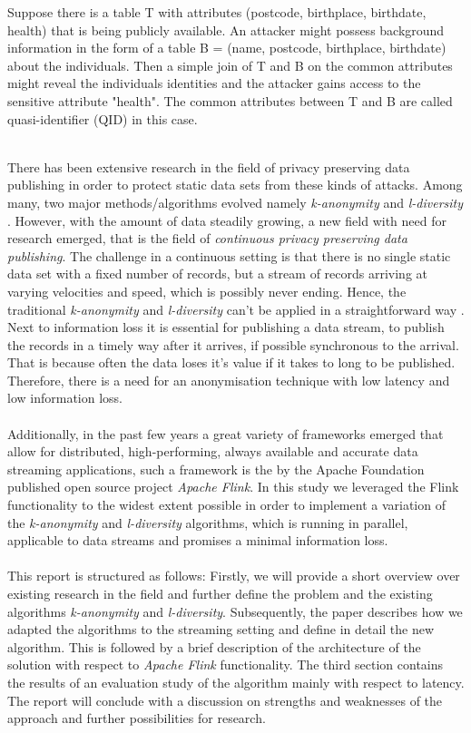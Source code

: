 \begin{example} Suppose there is a table T with attributes (postcode, birthplace, birthdate, health) that is being publicly available. An attacker might possess background information in the form of a table B = (name, postcode, birthplace, birthdate) about the individuals. Then a simple join of T and B on the common attributes might reveal the individuals identities and the attacker gains access to the sensitive attribute "health". The common attributes between T and B are called quasi-identifier (QID) in this case.
\end{example} 
\\
\noindent There has been extensive research in the field of privacy preserving data publishing in order to protect static data sets from these kinds of attacks. Among many, two major methods/algorithms evolved namely \textit{k-anonymity} \cite{kanonymity2002} and \textit{l-diversity} \cite{ldiversity2006}. However, with the amount of data steadily growing, a new field with need for research emerged, that is the field of \textit{continuous privacy preserving data publishing}. The challenge in a continuous setting is that there is no single static data set with a fixed number of records, but a stream of records arriving at varying velocities and speed, which is possibly never ending. Hence, the traditional \textit{k-anonymity} and \textit{l-diversity} can't be applied in a straightforward way \cite{CpppOfDataStreams}. Next to information loss it is essential for publishing a data stream, to publish the records in a timely way after it arrives, if possible synchronous to the arrival. That is because often the data loses it's value if it takes to long to be published. Therefore, there is a need for an anonymisation technique with low latency and low information loss. \\
\\
Additionally, in the past few years a great variety of frameworks emerged that allow for distributed, high-performing, always available and accurate data streaming applications, such a framework is the by the Apache Foundation published open source project \textit{Apache Flink}.
In this study we leveraged the Flink functionality to the widest extent possible in order to implement a variation of the \textit{k-anonymity} and \textit{l-diversity} algorithms, which is running in parallel, applicable to data streams and promises a minimal information loss. \\
\\
This report is structured as follows: Firstly, we will provide a short overview over existing research in the field and further define the problem and the existing algorithms \textit{k-anonymity} and \textit{l-diversity}. Subsequently, the paper describes how we adapted the algorithms to the streaming setting and define in detail the new algorithm. This is followed by a brief description of the architecture of the solution with respect to \textit{Apache Flink} functionality. The third section contains the results of an evaluation study of the algorithm mainly with respect to latency. The report will conclude with a discussion on strengths and weaknesses of the approach and further possibilities for research.